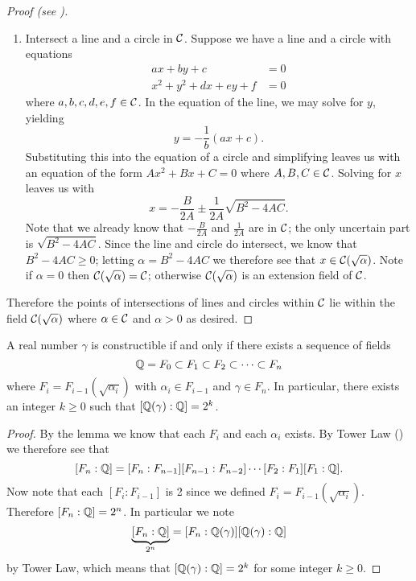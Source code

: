 \begin{proof}[Proof (see {\cite[pp.~272-273]{judson_beezer_2022}})]
\begin{enumerate}
        \item Intersect a line and a circle in $\mathcal{C}$. Suppose we have a line and a circle with equations
        \begin{align*}
            ax + by + c &= 0\\
            x^2 + y^2 + dx + ey + f &= 0
        \end{align*}
        where $a,b,c,d,e,f \in \mathcal{C}$. In the equation of the line, we may solve for $y$, yielding
        \[
            y = -\frac1b(ax + c).
        \]
        Substituting this into the equation of a circle and simplifying leaves us with an equation of the form $Ax^2 + Bx + C = 0$ where $A,B,C\in\mathcal{C}$. Solving for $x$ leaves us with
        \[
            x = -\frac{B}{2A} \pm \frac{1}{2A}\sqrt{B^2-4AC}.
        \]
        Note that we already know that $-\frac{B}{2A}$ and $\frac{1}{2A}$ are in $\mathcal{C}$; the only uncertain part is $\sqrt{B^2-4AC}$. Since the line and circle do intersect, we know that $B^2-4AC \geq 0$; letting $\alpha = B^2 - 4AC$ we therefore see that $x \in \mathcal{C}(\sqrt\alpha)$. Note if $\alpha = 0$ then $\mathcal{C}(\sqrt\alpha) = \mathcal{C}$; otherwise $\mathcal{C}(\sqrt\alpha)$ is an extension field of $\mathcal{C}$.
    \end{enumerate}
    Therefore the points of intersections of lines and circles within $\mathcal{C}$ lie within the field $\mathcal{C}(\sqrt\alpha)$ where $\alpha \in \mathcal{C}$ and $\alpha > 0$ as desired.
\end{proof}

\begin{theorem}\label{thrm-condition-for-constructability}
    A real number $\gamma$ is constructible if and only if there exists a sequence of fields
    \[
        \mathbb{Q} = F_0 \subset F_1 \subset F_2 \subset \cdots \subset F_n
    \]
    where $F_i = F_{i-1}(\sqrt{\alpha_i})$ with $\alpha_i \in F_{i-1}$ and $\gamma \in F_n$. In particular, there exists an integer $k \geq 0$ such that $[\mathbb{Q}(\gamma):\mathbb{Q}] = 2^k$.
\end{theorem}
\begin{proof}
    By the lemma we know that each $F_i$ and each $\alpha_i$ exists. By Tower Law () we therefore see that
    \[
        [F_n:\mathbb{Q}] = [F_n:F_{n-1}][F_{n-1}:F_{n-2}]\cdots[F_2:F_1][F_1:\mathbb{Q}].
    \]
    Now note that each $[F_i:F_{i-1}]$ is 2 since we defined $F_i = F_{i-1}(\sqrt{\alpha_i})$. Therefore $[F_n:\mathbb{Q}] = 2^n$. In particular we note
    \[
        \underbrace{[F_n:\mathbb{Q}]}_{2^n} = [F_n:\mathbb{Q}(\gamma)][\mathbb{Q}(\gamma):\mathbb{Q}]
    \]
    by Tower Law, which means that $[\mathbb{Q}(\gamma):\mathbb{Q}] = 2^k$ for some integer $k \geq 0$.
\end{proof}

